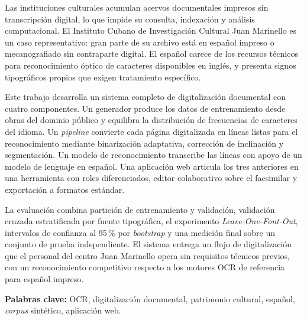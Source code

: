 \begin{resumen}
	Las instituciones culturales acumulan acervos documentales impresos sin transcripción digital, lo que impide su consulta, indexación y análisis computacional. El Instituto Cubano de Investigación Cultural Juan Marinello es un caso representativo: gran parte de su archivo está en español impreso o mecanografiado sin contraparte digital. El español carece de los recursos técnicos para reconocimiento óptico de caracteres disponibles en inglés, y presenta signos tipográficos propios que exigen tratamiento específico.
	
	Este trabajo desarrolla un sistema completo de digitalización documental con cuatro componentes. Un generador produce los datos de entrenamiento desde obras del dominio público y equilibra la distribución de frecuencias de caracteres del idioma. Un \textit{pipeline} convierte cada página digitalizada en líneas listas para el reconocimiento mediante binarización adaptativa, corrección de inclinación y segmentación. Un modelo de reconocimiento transcribe las líneas con apoyo de un modelo de lenguaje en español. Una aplicación web articula los tres anteriores en una herramienta con roles diferenciados, editor colaborativo sobre el facsimilar y exportación a formatos estándar.
	
	La evaluación combina partición de entrenamiento y validación, validación cruzada estratificada por fuente tipográfica, el experimento \textit{Leave-One-Font-Out}, intervalos de confianza al 95\,\% por \textit{bootstrap} y una medición final sobre un conjunto de prueba independiente. El sistema entrega un flujo de digitalización que el personal del centro Juan Marinello opera sin requisitos técnicos previos, con un reconocimiento competitivo respecto a los motores OCR de referencia para español impreso.
	
	\textbf{Palabras clave:} OCR, digitalización documental, patrimonio cultural, español, \textit{corpus} sintético, aplicación web.
\end{resumen}

